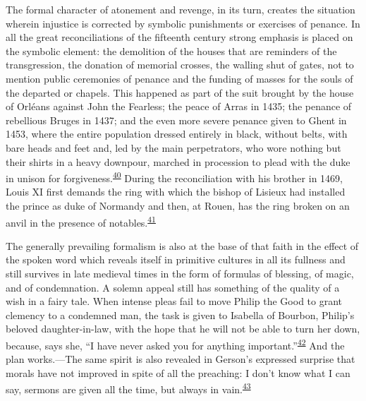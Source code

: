 The formal character of atonement and revenge, in its turn,
cre\protect\hypertarget{18_Chapter_Eleven__THE_FORMS_OF_THO.xhtmlux5cux23page_281}{}{}ates
the situation wherein injustice is corrected by symbolic punishments or
exercises of penance. In all the great reconciliations of the fifteenth
century strong emphasis is placed on the symbolic element: the
demolition of the houses that are reminders of the transgression, the
donation of memorial crosses, the walling shut of gates, not to mention
public ceremonies of penance and the funding of masses for the souls of
the departed or chapels. This happened as part of the suit brought by
the house of Orléans against John the Fearless; the peace of Arras in
1435; the penance of rebellious Bruges in 1437; and the even more severe
penance given to Ghent in 1453, where the entire population dressed
entirely in black, without belts, with bare heads and feet and, led by
the main perpetrators, who wore nothing but their shirts in a heavy
downpour, marched in procession to plead with the duke in unison for
forgiveness.\textsuperscript{\protect\hypertarget{18_Chapter_Eleven__THE_FORMS_OF_THO.xhtmlux5cux23id_553}{\protect\hyperlink{23_NOTES.xhtmlux5cux23id_554}{40}}}
During the reconciliation with his brother in 1469, Louis XI first
demands the ring with which the bishop of Lisieux had installed the
prince as duke of Normandy and then, at Rouen, has the ring broken on an
anvil in the presence of
notables.\textsuperscript{\protect\hypertarget{18_Chapter_Eleven__THE_FORMS_OF_THO.xhtmlux5cux23id_551}{\protect\hyperlink{23_NOTES.xhtmlux5cux23id_552}{41}}}

The generally prevailing formalism is also at the base of that faith in
the effect of the spoken word which reveals itself in primitive cultures
in all its fullness and still survives in late medieval times in the
form of formulas of blessing, of magic, and of condemnation. A solemn
appeal still has something of the quality of a wish in a fairy tale.
When intense pleas fail to move Philip the Good to grant clemency to a
condemned man, the task is given to Isabella of Bourbon, Philip's
beloved daughter-in-law, with the hope that he will not be able to turn
her down, because, says she, ``I have never asked you for anything
important.''\textsuperscript{\protect\hypertarget{18_Chapter_Eleven__THE_FORMS_OF_THO.xhtmlux5cux23id_549}{\protect\hyperlink{23_NOTES.xhtmlux5cux23id_550}{42}}}
And the plan works.---The same spirit is also revealed in Gerson's
expressed surprise that morals have not improved in spite of all the
preaching: I don't know what I can say, sermons are given all the time,
but always in
vain.\textsuperscript{\protect\hypertarget{18_Chapter_Eleven__THE_FORMS_OF_THO.xhtmlux5cux23id_547}{\protect\hyperlink{23_NOTES.xhtmlux5cux23id_548}{43}}}

